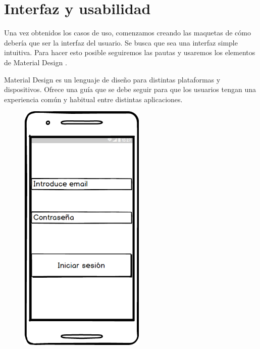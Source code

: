 \newpage
\section{Interfaz y usabilidad}
Una vez obtenidos los casos de uso, comenzamos creando las maquetas de cómo debería que ser la interfaz del usuario.
Se busca que sea una interfaz simple  intuitiva.
Para hacer esto posible seguiremos las pautas y usaremos los elementos de Material Design \cite{1}. 


Material Design es un lenguaje de diseño para distintas plataformas y dispositivos. Ofrece una guía que se debe seguir para que los usuarios  tengan una experiencia común y habitual entre distintas aplicaciones.


	
	
	
	\begin{figure}[htbp]
\begin{minipage}[b]{0.5\linewidth} %
\centering
\includegraphics[width=6cm]{maqueta/Iniciar.png}
 

\end{minipage}
\end{figure}
